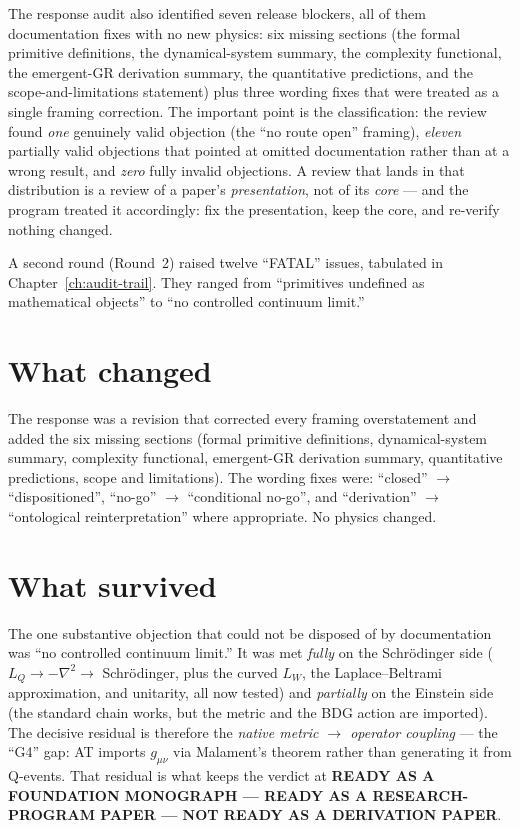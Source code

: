 \documentclass[10pt,twoside,openany]{book}
\begin{document}
The response audit also identified seven release blockers, all of them documentation fixes
with no new physics: six missing sections (the formal primitive definitions, the
dynamical-system summary, the complexity functional, the emergent-GR derivation summary,
the quantitative predictions, and the scope-and-limitations statement) plus three wording
fixes that were treated as a single framing correction. The important point is the
classification: the review found \emph{one} genuinely valid objection (the ``no route open''
framing), \emph{eleven} partially valid objections that pointed at omitted documentation
rather than at a wrong result, and \emph{zero} fully invalid objections. A review that
lands in that distribution is a review of a paper's \emph{presentation}, not of its
\emph{core} --- and the program treated it accordingly: fix the presentation, keep the
core, and re-verify nothing changed.

A second round (Round~2) raised twelve ``FATAL'' issues, tabulated in
Chapter~\ref{ch:audit-trail}. They ranged from ``primitives undefined as mathematical
objects'' to ``no controlled continuum limit.''

\section{What changed}

The response was a revision that corrected every framing overstatement and added the six
missing sections (formal primitive definitions, dynamical-system summary, complexity
functional, emergent-GR derivation summary, quantitative predictions, scope and
limitations). The wording fixes were: ``closed'' $\to$ ``dispositioned'', ``no-go'' $\to$
``conditional no-go'', and ``derivation'' $\to$ ``ontological reinterpretation'' where
appropriate. No physics changed.

\section{What survived}

The one substantive objection that could not be disposed of by documentation was ``no
controlled continuum limit.'' It was met \emph{fully} on the Schr\"odinger side
($L_Q\to-\nabla^2\to$ Schr\"odinger, plus the curved $L_W$, the Laplace--Beltrami
approximation, and unitarity, all now tested) and \emph{partially} on the Einstein side
(the standard chain works, but the metric and the BDG action are imported). The decisive
residual is therefore the \emph{native metric $\to$ operator coupling} --- the ``G4'' gap:
AT imports $g_{\mu\nu}$ via Malament's theorem rather than generating it from Q-events.
That residual is what keeps the verdict at \textbf{READY AS A FOUNDATION MONOGRAPH ---
READY AS A RESEARCH-PROGRAM PAPER --- NOT READY AS A DERIVATION PAPER}.
\end{document}
